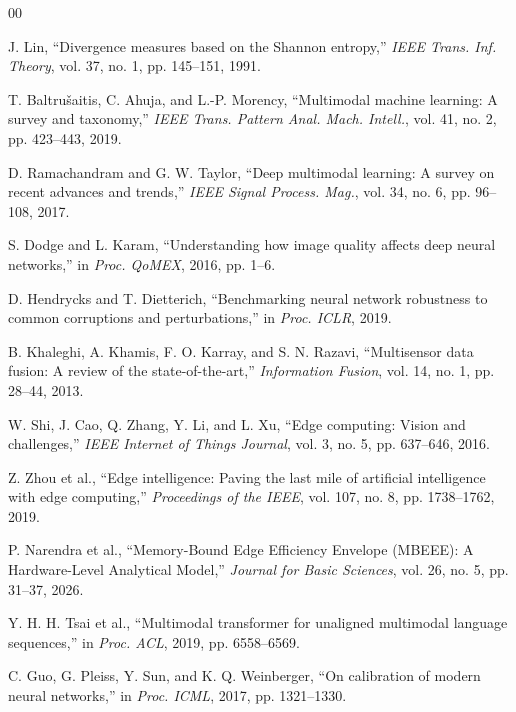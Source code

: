 \documentclass[conference]{IEEEtran}
\begin{document}
\begin{thebibliography}{00}
\small

 J. Lin, ``Divergence measures based on the Shannon entropy,'' \emph{IEEE Trans. Inf. Theory}, vol. 37, no. 1, pp. 145--151, 1991.

 T. Baltru{\v{s}}aitis, C. Ahuja, and L.-P. Morency, ``Multimodal machine learning: A survey and taxonomy,'' \emph{IEEE Trans. Pattern Anal. Mach. Intell.}, vol. 41, no. 2, pp. 423--443, 2019.

 D. Ramachandram and G. W. Taylor, ``Deep multimodal learning: A survey on recent advances and trends,'' \emph{IEEE Signal Process. Mag.}, vol. 34, no. 6, pp. 96--108, 2017.

 S. Dodge and L. Karam, ``Understanding how image quality affects deep neural networks,'' in \emph{Proc. QoMEX}, 2016, pp. 1--6.

 D. Hendrycks and T. Dietterich, ``Benchmarking neural network robustness to common corruptions and perturbations,'' in \emph{Proc. ICLR}, 2019.

 B. Khaleghi, A. Khamis, F. O. Karray, and S. N. Razavi, ``Multisensor data fusion: A review of the state-of-the-art,'' \emph{Information Fusion}, vol. 14, no. 1, pp. 28--44, 2013.

 W. Shi, J. Cao, Q. Zhang, Y. Li, and L. Xu, ``Edge computing: Vision and challenges,'' \emph{IEEE Internet of Things Journal}, vol. 3, no. 5, pp. 637--646, 2016.

 Z. Zhou et al., ``Edge intelligence: Paving the last mile of artificial intelligence with edge computing,'' \emph{Proceedings of the IEEE}, vol. 107, no. 8, pp. 1738--1762, 2019.

 P. Narendra et al., ``Memory-Bound Edge Efficiency Envelope (MBEEE): A Hardware-Level Analytical Model,'' \emph{Journal for Basic Sciences}, vol. 26, no. 5, pp. 31--37, 2026.

 Y. H. H. Tsai et al., ``Multimodal transformer for unaligned multimodal language sequences,'' in \emph{Proc. ACL}, 2019, pp. 6558--6569.

 C. Guo, G. Pleiss, Y. Sun, and K. Q. Weinberger, ``On calibration of modern neural networks,'' in \emph{Proc. ICML}, 2017, pp. 1321--1330.


\end{thebibliography}
\end{document}

